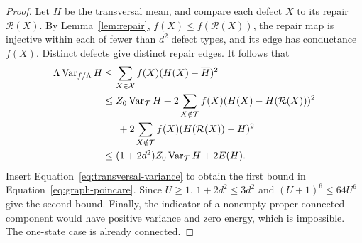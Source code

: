 \begin{proof}
Let $\overline H$ be the transversal mean, and compare each defect $X$
to its repair $\mathcal R(X)$.  By Lemma~\ref{lem:repair},
$f(X)\le f(\mathcal R(X))$, the repair map is injective within each
of fewer than $d^2$ defect types, and its edge has conductance $f(X)$.
Distinct defects give distinct repair edges.  It follows that
\begin{align*}
 \Lambda\operatorname{Var}_{f/\Lambda}H
 &\le\sum_{X\in\mathcal X}f(X)(H(X)-\overline H)^2\\
 &\le Z_0\operatorname{Var}_{\mathcal T}H
      +2\sum_{X\notin\mathcal T}f(X)
                         (H(X)-H(\mathcal R(X)))^2\\
 &\hspace{1.5em}+2\sum_{X\notin\mathcal T}f(X)
                         (H(\mathcal R(X))-\overline H)^2\\
 &\le (1+2d^2)Z_0\operatorname{Var}_{\mathcal T}H+2E(H).
\end{align*}
Insert Equation~\eqref{eq:transversal-variance} to obtain the first
bound in Equation~\eqref{eq:graph-poincare}.  Since $U\ge1$,
$1+2d^2\le3d^2$ and $(U+1)^6\le64U^6$ give the second bound.
Finally, the indicator of a nonempty proper connected component would
have positive variance and zero energy, which is impossible.  The
one-state case is already connected.
\end{proof}
